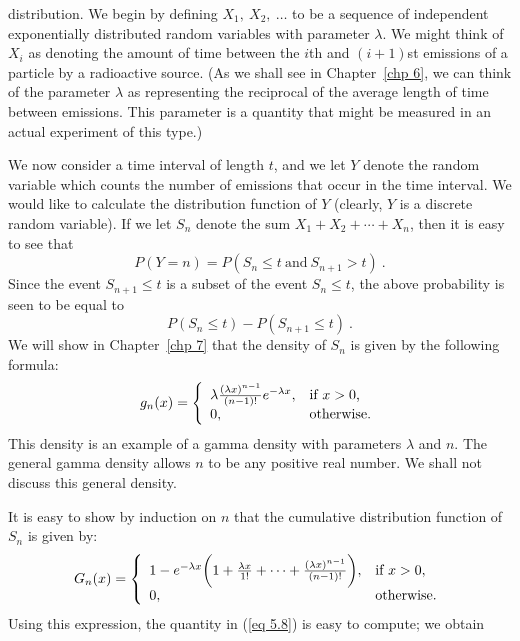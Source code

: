distribution.   We begin by defining $X_1,\ X_2,\ \ldots$ to be a sequence of
independent exponentially distributed random variables with parameter $\lambda$.  We
might think of $X_i$ as denoting the amount of time between the $i$th and $(i+1)$st
emissions of a particle by a radioactive source.  (As we shall see in Chapter~\ref{chp
6}, we can think of the parameter
$\lambda$ as representing the reciprocal of the average length of time between
emissions.  This  parameter is a quantity that might be measured in an actual
experiment of this type.)  
\par We now consider a time interval of length $t$, and we let $Y$ denote the random
variable which  counts the number of emissions that occur in the time interval.  We
would like to calculate the distribution function of
$Y$ (clearly, $Y$ is a discrete random variable).   If we let $S_n$ denote the sum
$X_1 + X_2 + 
\cdots + X_n$, then it is easy to see that
$$P(Y = n) = P(S_n \le t\ \mbox{and}\ S_{n+1} > t)\ .$$ 
Since the event $S_{n+1} \le t$ is a subset of the event $S_n \le t$, the above
probability is seen  to be equal to
\begin{equation} P(S_n \le t) - P(S_{n+1} \le t)\ .\label{eq 5.8}
\end{equation} We will show in Chapter~\ref{chp 7} that the density of $S_n$ is given
by the following formula:
$$ g_n(x) = \left \{ \begin{array}{ll}
                       \lambda{{(\lambda x)^{n-1}}\over{(n-1)!}}e^{-\lambda x}, 
                                          & \mbox{if $x > 0$,} \\
                               0,         & \mbox{otherwise.}
                  \end{array}
         \right. 
$$ This density is an example of a gamma density
with parameters
$\lambda$ and
$n$.   The general gamma density allows $n$ to be any positive real number.  We shall not discuss
this general density.
\par
It is easy to show by induction on $n$ that the cumulative distribution function of
$S_n$ is given by:
$$ G_n(x) = \left \{ \begin{array}{ll}
                         1 - e^{-\lambda x}\biggl(1 + {{\lambda x}\over {1!}} + \cdots
+
                         {{(\lambda x)^{n-1}}\over{(n-1)!}}\biggr), & \mbox{if $x >
0$}, \\
                         0,         & \mbox{otherwise.}
                   \end{array}
          \right. 
$$ Using this expression, the quantity in (\ref{eq 5.8}) is easy to compute; we obtain
